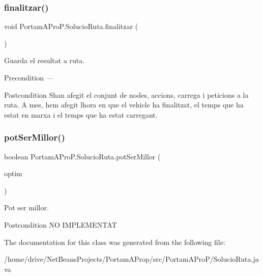 \subsubsection{\texorpdfstring{finalitzar()}{finalitzar()}}
{\footnotesize\ttfamily void Portam\+A\+Pro\+P.\+Solucio\+Ruta.\+finalitzar (\begin{DoxyParamCaption}{ }\end{DoxyParamCaption})}



Guarda el resultat a ruta. 

\begin{DoxyPrecond}{Precondition}
--- 
\end{DoxyPrecond}
\begin{DoxyPostcond}{Postcondition}
S\textquotesingle{}han afegit el conjunt de nodes, accions, carrega i peticions a la ruta. A mes, hem afegit l\textquotesingle{}hora en que el vehicle ha finalitzat, el temps que ha estat en marxa i el temps que ha estat carregant. 
\end{DoxyPostcond}
\mbox{\label{class_portam_a_pro_p_1_1_solucio_ruta_adda943e292f59567d947a45725892480}} 
\subsubsection{\texorpdfstring{pot\+Ser\+Millor()}{potSerMillor()}}
{\footnotesize\ttfamily boolean Portam\+A\+Pro\+P.\+Solucio\+Ruta.\+pot\+Ser\+Millor (\begin{DoxyParamCaption}\item[{\hyperlink{class_portam_a_pro_p_1_1_solucio_ruta}{Solucio\+Ruta}}]{optim }\end{DoxyParamCaption})}



Pot ser millor. 

\begin{DoxyPostcond}{Postcondition}
NO I\+M\+P\+L\+E\+M\+E\+N\+T\+AT 
\end{DoxyPostcond}


The documentation for this class was generated from the following file\+:\begin{DoxyCompactItemize}
\item 
/home/drive/\+Net\+Beans\+Projects/\+Portam\+A\+Prop/src/\+Portam\+A\+Pro\+P/Solucio\+Ruta.\+java\end{DoxyCompactItemize}
